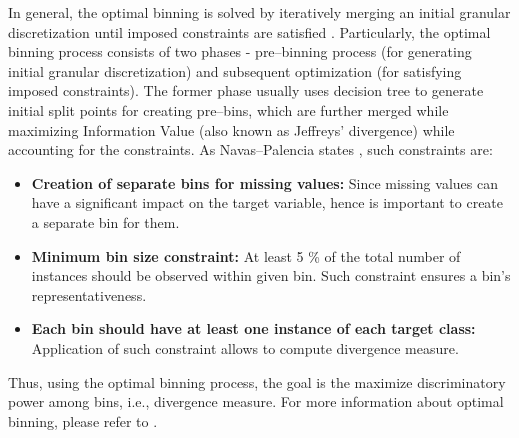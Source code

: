 In general, the optimal binning is solved by iteratively merging an initial granular discretization until imposed constraints are satisfied \citep{navas2020optimal}. Particularly, the optimal binning process consists of two phases - pre--binning process (for generating initial granular discretization) and subsequent optimization (for satisfying imposed constraints).
The former phase usually uses decision tree to generate initial split points for creating pre--bins, which are further merged while maximizing Information Value (also known as Jeffreys' divergence) while accounting for the constraints.
As Navas--Palencia states \citep{navas2020optimal}, such constraints are:
\begin{itemize}\setlength\itemsep{0em} 
    \item \textbf{Creation of separate bins for missing values:} Since missing values can have a significant impact on the target variable, hence is important to create a separate bin for them.
    \item \textbf{Minimum bin size constraint:} At least 5 \% of the total number of instances should be observed within given bin. Such constraint ensures a bin's representativeness.
    \item \textbf{Each bin should have at least one instance of each target class:} Application of such constraint allows to compute divergence measure.
\end{itemize}
Thus, using the optimal binning process, the goal is the maximize discriminatory power among bins, i.e., divergence measure.
For more information about optimal binning, please refer to \citep{navas2020optimal}.

